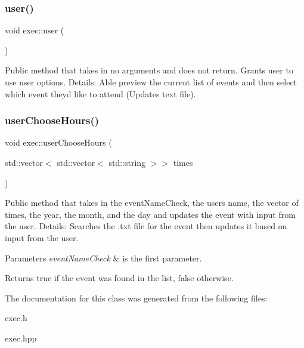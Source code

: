 \subsubsection{\texorpdfstring{user()}{user()}}
{\footnotesize\ttfamily void exec\+::user (\begin{DoxyParamCaption}{ }\end{DoxyParamCaption})}

Public method that takes in no arguments and does not return. Grants user to use user options. Details\+: Able preview the current list of events and then select which event they\textquotesingle{}d like to attend (Updates text file). \mbox{\label{classexec_a24fd11e0df1de9dee4fcc41623815aea}} 
\subsubsection{\texorpdfstring{user\+Choose\+Hours()}{userChooseHours()}}
{\footnotesize\ttfamily void exec\+::user\+Choose\+Hours (\begin{DoxyParamCaption}\item[{std\+::vector$<$ std\+::vector$<$ std\+::string $>$$>$}]{times }\end{DoxyParamCaption})}

Public method that takes in the event\+Name\+Check, the user\textquotesingle{}s name, the vector of times, the year, the month, and the day and updates the event with input from the user. Details\+: Searches the .txt file for the event then updates it based on input from the user. 
\begin{DoxyParams}{Parameters}
{\em event\+Name\+Check} & is the first parameter. \\
\hline
\end{DoxyParams}
\begin{DoxyReturn}{Returns}
true if the event was found in the list, false otherwise. 
\end{DoxyReturn}


The documentation for this class was generated from the following files\+:\begin{DoxyCompactItemize}
\item 
exec.\+h\item 
exec.\+hpp\end{DoxyCompactItemize}
